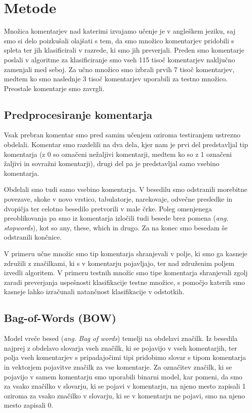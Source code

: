 \documentclass{acm_proc_article-sp}
\begin{document}
\section{Metode}
Množica komentarjev nad katerimi izvajamo učenje je v angleškem jeziku, saj smo si delo poizkušali olajšati s tem, da smo množico komentarjev pridobili s spleta ter jih klasificirali v razrede, ki smo jih preverjali. 
Preden smo komentarje poslali v algoritme za klasificiranje smo vseh 115 tisoč komentarjev naključno zamenjali med seboj. 
Za učno množico smo izbrali prvih 7 tisoč komentarjev, medtem ko smo naslednje 3 tisoč komentarjev uporabili za testno množico. Preostale komentarje smo zavrgli.

\subsection{Predprocesiranje komentarja}
Vsak prebran komentar smo pred samim učenjem oziroma testiranjem ustrezno obdelali. Komentar smo razdelili na dva dela, kjer nam je prvi del predstavljal tip komentarja (z 0 so označeni nežaljivi komentarji, medtem ko so z 1 označeni žaljivi in sovražni komentarji), drugi del pa je predstavljal samo vsebino komentarja. 

Obdelali smo tudi samo vsebino komentarja. V besedilu smo odstranili morebitne povezave, skoke v novo vrstico, tabulatorje, narekovaje, odvečne presledke in dvopičja ter celotno besedilo pretvorili v male črke. Poleg omenjenega preoblikovanja pa smo iz komentarja izločili tudi besede brez pomena ({\it ang. stopwords}), kot so any, these, which in drugo. Za na konec smo besedam še odstranili končnice.

V primeru učne množic smo tip komentarja shranjevali v polje, ki smo ga kasneje združili z značilkami, ki s v komentarju pojavljajo, ter nad združenim poljem izvedli algoritem. V primeru testnih množic smo tipe komentarja shranjevali zgolj zaradi preverjanja uspešnosti klasifikacije testne množice, s pomočjo katerih smo kasneje lahko izračunali natančnost klasifikacije v odstotkih.

\subsection{Bag-of-Words (BOW)}
Model vreče besed ({\it ang. Bag of words}) temelji na obdelavi značilk.
Iz besedila najprej z obdelavo slovarja vseh značilk, ki se pojavijo v vseh komentarjih, ter polja vseh komentarjev s pripadajočimi tipi pridobimo slovar s tipom komentarja in vektorjem pojavitve značilk za vse komentarje.
Za označitev značilk, ki se pojavijo v samem komentarju smo uporabili binarni model, kar pomeni, da smo za vsako značilko v slovarju, ki se pojavi v komentarju, na njeno mesto zapisali 1 oziroma za vsako značilko v slovarju, ki se v komentarju ne pojavi, smo na njeno mesto zapisali 0.
\end{document}
